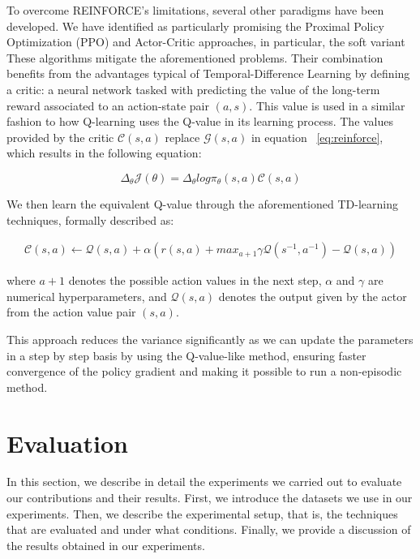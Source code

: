 To overcome REINFORCE's limitations, several other paradigms have been developed. We have identified as particularly promising the Proximal Policy Optimization (PPO)
and Actor-Critic
 approaches, in particular, the soft variant
 These algorithms mitigate the aforementioned problems.
Their combination benefits from the advantages typical of Temporal-Difference Learning
 by defining a critic: a neural network tasked with predicting the value of the long-term reward associated to an action-state pair $(a,s)$. This value is used in a similar fashion to how Q-learning
 uses the Q-value in its learning process. The values provided by the critic $\mathcal{C}(s,a)$ replace $\mathcal{G}(s,a)$ in equation
~\ref{eq:reinforce}, which results in the following equation:

\begin{equation}
\label{eq:ActorCritic}
    \Delta_{\theta}\mathcal{J}(\theta) =\Delta_{\theta}log\pi_{\theta}(s,a)\mathcal{C}(s,a) 
\end{equation}

We then learn the equivalent Q-value through the aforementioned TD-learning techniques, formally described as:

\begin{equation}
\label{eq:TemporalDifference}
\begin{split}
    \mathcal{C}(s,a) \gets \mathcal{Q}(s,a) + \alpha(r(s,a) + max_{a+1} \gamma \mathcal{Q}(s^{-1},a^{-1}) - \mathcal{Q}(s,a))
\end{split}
\end{equation}

where $a+1$ denotes the possible action values in the next step, $\alpha$ and $\gamma$ are numerical hyperparameters, and $\mathcal{Q}(s,a)$ denotes the output given by the actor from the action value pair $(s,a)$.

This approach reduces the variance significantly as we can update the parameters in a step by step basis by using the Q-value-like method, ensuring faster convergence of the policy gradient and making it possible to run a non-episodic method.

\section{Evaluation}\label{sec:spacerl-evaluation}
In this section, we describe in detail the experiments we carried out to evaluate our contributions and their results. First, we introduce the datasets we use in our experiments. Then, we describe the experimental setup, that is, the techniques that are evaluated and under what conditions. Finally, we provide a discussion of the results obtained in our experiments.


